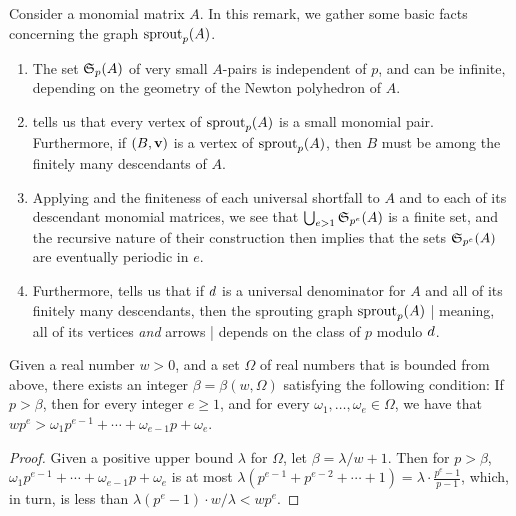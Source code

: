 \documentclass{amsart}
\begin{document}
\begin{remark}
   \label{elementary1: R}
   Consider a monomial matrix $A$.
   In this remark, we gather some basic facts concerning the graph $\operatorname{sprout}_p(A)$.
\begin{enumerate}
\item The set $\mathfrak{S}_p(A)$ of very small $A$-pairs is independent of $p$, and can be infinite, depending on the geometry of the Newton polyhedron of $A$.

\item \label{elementary1 small pairs}  tells us that every vertex of $\operatorname{sprout}_p(A)$ is a small monomial pair.  Furthermore, if $(B,\mathbf{v})$ is a vertex of $\operatorname{sprout}_p(A)$, then $B$ must be among the finitely many descendants of $A$.

\item \label{elementary1 periodic in e} Applying  and the finiteness of each universal shortfall to $A$ and to each of its descendant monomial matrices, we see that $\bigcup_{e>1} \mathfrak{S}_{p^e}(A)$ is a finite set, and the recursive nature of their construction then implies that the sets $\mathfrak{S}_{p^e}(A)$ are eventually periodic in $e$.

\item \label{elementary1 periodic in p} Furthermore,  tells us that if $d$ is a universal denominator for $A$ and all of its finitely many descendants, then the sprouting graph  $\operatorname{sprout}_p(A)$ | meaning, all of its vertices \emph{and} arrows | depends on the class of $p$ modulo $d$.
\end{enumerate}
\end{remark}


\begin{lemma}
   \label{positive-polynomial: L}
   Given a real number $w > 0$, and a set $\Omega$ of real numbers that is bounded from above, there exists an integer $\beta = \beta(w, \Omega)$ satisfying the following condition\textup:
   If $p > \beta$, then for every integer $e \geq 1$, and for every $\omega_1, \ldots, \omega_e \in \Omega$, we have that $wp^{e} >  \omega_1 p^{e-1} + \cdots + \omega_{e-1} p + \omega_e$.
\end{lemma}

\begin{proof}
   Given a positive upper bound $\lambda$ for $\Omega$, let $\beta = \lambda/w  + 1$.
   Then for $p>\beta$, $\omega_1 p^{e-1} + \cdots + \omega_{e-1}  p + \omega_e$ is at most $\lambda(p^{e-1} + p^{e-2} + \cdots + 1) = \lambda \cdot \frac{p^e-1}{p-1}$, which, in turn, is less than $\lambda (p^e-1) \cdot w/\lambda < w p^e$.
\end{proof}
\end{document}

